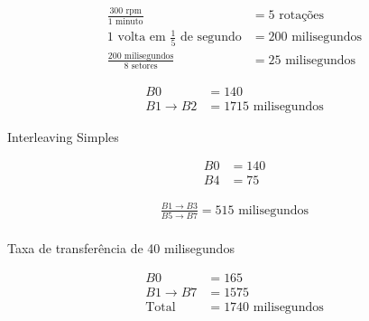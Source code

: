 \begin{question}

    \begin{align*} 
        \frac{300 \text{ rpm}}{1 \text{ minuto}} &= 5 \text{ rotações} \\ 
        \text{1 volta em }\frac{1}{5} \text{ de segundo} &= 200 \text{ milisegundos} \\
        \frac{200 \text{ milisegundos}}{8 \text{ setores}} &= 25 \text{ milisegundos} 
    \end{align*}

    \begin{align*} 
        B0 &= 140 \\
        B1 \rightarrow B2 &= 1715 \text{ milisegundos}
    \end{align*}

    \begin{center}
        Interleaving Simples
    \end{center}
    \begin{align*} 
        B0 &= 140 \\
        B4 &= 75 
    \end{align*}

    \begin{align*} 
        \frac{B1 \rightarrow B3 }{B5 \rightarrow B7} = 515 \text{ milisegundos} \\
    \end{align*}
    
    \begin{center}
        Taxa de transferência de 40 milisegundos
    \end{center}

    \begin{align*} 
        B0 &= 165 \\ 
        B1 \rightarrow B7 &= 1575 \\ 
        \text{Total} &= 1740 \text{ milisegundos} 
    \end{align*}

\end{question}
